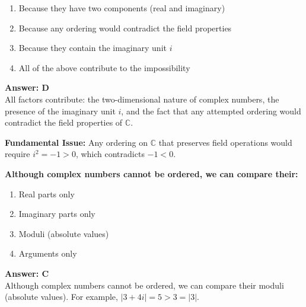 \documentclass[12pt,a4paper]{article}
\begin{document}
\begin{partbox}[Options]
\begin{enumerate}[label=\Alph*.]
    \item Because they have two components (real and imaginary)
    \item Because any ordering would contradict the field properties
    \item Because they contain the imaginary unit \( i \)
    \item All of the above contribute to the impossibility
\end{enumerate}
\end{partbox}

\begin{answerstyle}
\textbf{Answer: D} \\
All factors contribute: the two-dimensional nature of complex numbers, the presence of the imaginary unit \( i \), and the fact that any attempted ordering would contradict the field properties of \( \mathbb{C} \).
\end{answerstyle}

\begin{conceptbox}
\textbf{Fundamental Issue:} Any ordering on \( \mathbb{C} \) that preserves field operations would require \( i^2 = -1 > 0 \), which contradicts \( -1 < 0 \).
\end{conceptbox}

\newpage
\begin{questiontitle}[MCQ 70]
\textbf{Although complex numbers cannot be ordered, we can compare their:}
\end{questiontitle}

\begin{partbox}[Options]
\begin{enumerate}[label=\Alph*.]
    \item Real parts only
    \item Imaginary parts only
    \item Moduli (absolute values)
    \item Arguments only
\end{enumerate}
\end{partbox}

\begin{answerstyle}
\textbf{Answer: C} \\
Although complex numbers cannot be ordered, we can compare their moduli (absolute values). For example, \( |3 + 4i| = 5 > 3 = |3| \).
\end{answerstyle}
\end{document}
